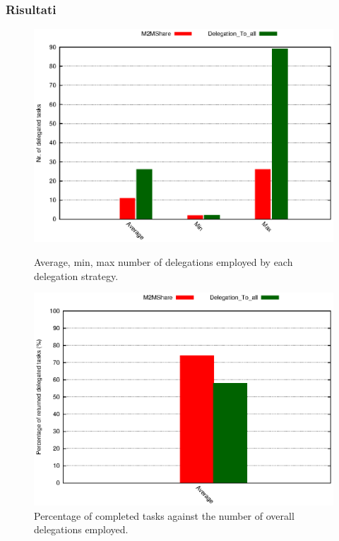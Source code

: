 \documentclass{beamer}
\begin{document}
\begin{frame}
\frametitle{Risultati}
\begin{figure}[ht]
\begin{minipage}[b]{0.45\linewidth}
\centering
\includegraphics[scale=0.4]{delegheFatte.eps}
\caption{Average, min, max number of delegations employed by each delegation strategy.}
\end{minipage}
\hspace{0.5cm}
\begin{minipage}[b]{0.45\linewidth}
\centering
\includegraphics[scale=0.4]{percDeleghe.eps}
\caption{Percentage of completed tasks against the number of overall delegations employed.}
\end{minipage}
\end{figure}
\end{frame}
\end{document}
